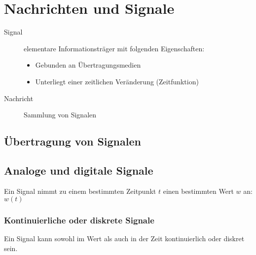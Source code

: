 \chapter{Nachrichten und Signale}
\begin{description}
\item[Signal] elementare Informationsträger mit folgenden Eigenschaften:
\begin{itemize}
\item Gebunden an Übertragungsmedien
\item Unterliegt einer zeitlichen Veränderung (Zeitfunktion)
\end{itemize}
\item[Nachricht] Sammlung von Signalen
\end{description}

\section{Übertragung von Signalen}











\section{Analoge und digitale Signale}

Ein Signal nimmt zu einem bestimmten Zeitpunkt $t$ einen bestimmten Wert $w$ an: $w(t)$

\subsection{Kontinuierliche oder diskrete Signale}

Ein Signal kann sowohl im Wert als auch in der Zeit kontinuierlich oder diskret sein. 

